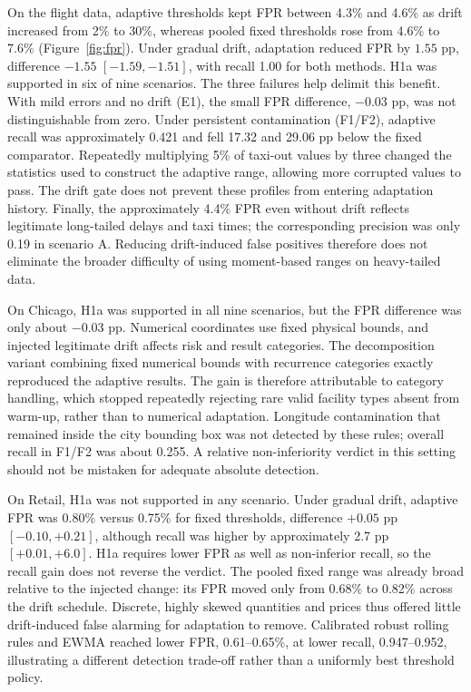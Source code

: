 On the flight data, adaptive thresholds kept FPR between 4.3\% and 4.6\% as drift increased from 2\% to 30\%, whereas pooled fixed thresholds rose from 4.6\% to 7.6\% (Figure~\ref{fig:fpr}). Under gradual drift, adaptation reduced FPR by $1.55$ pp, difference $-1.55$ $[-1.59,-1.51]$, with recall 1.00 for both methods. H1a was supported in six of nine scenarios. The three failures help delimit this benefit. With mild errors and no drift (E1), the small FPR difference, $-0.03$ pp, was not distinguishable from zero. Under persistent contamination (F1/F2), adaptive recall was approximately 0.421 and fell 17.32 and 29.06 pp below the fixed comparator. Repeatedly multiplying 5\% of taxi-out values by three changed the statistics used to construct the adaptive range, allowing more corrupted values to pass. The drift gate does not prevent these profiles from entering adaptation history. Finally, the approximately 4.4\% FPR even without drift reflects legitimate long-tailed delays and taxi times; the corresponding precision was only 0.19 in scenario A. Reducing drift-induced false positives therefore does not eliminate the broader difficulty of using moment-based ranges on heavy-tailed data.

On Chicago, H1a was supported in all nine scenarios, but the FPR difference was only about $-0.03$ pp. Numerical coordinates use fixed physical bounds, and injected legitimate drift affects risk and result categories. The decomposition variant combining fixed numerical bounds with recurrence categories exactly reproduced the adaptive results. The gain is therefore attributable to category handling, which stopped repeatedly rejecting rare valid facility types absent from warm-up, rather than to numerical adaptation. Longitude contamination that remained inside the city bounding box was not detected by these rules; overall recall in F1/F2 was about 0.255. A relative non-inferiority verdict in this setting should not be mistaken for adequate absolute detection.

On Retail, H1a was not supported in any scenario. Under gradual drift, adaptive FPR was 0.80\% versus 0.75\% for fixed thresholds, difference $+0.05$ pp $[-0.10,+0.21]$, although recall was higher by approximately 2.7 pp $[+0.01,+6.0]$. H1a requires lower FPR as well as non-inferior recall, so the recall gain does not reverse the verdict. The pooled fixed range was already broad relative to the injected change: its FPR moved only from 0.68\% to 0.82\% across the drift schedule. Discrete, highly skewed quantities and prices thus offered little drift-induced false alarming for adaptation to remove. Calibrated robust rolling rules and EWMA reached lower FPR, 0.61--0.65\%, at lower recall, 0.947--0.952, illustrating a different detection trade-off rather than a uniformly best threshold policy.

